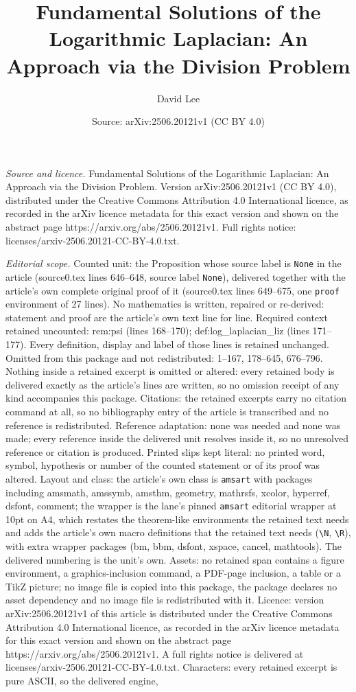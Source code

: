 \documentclass[10pt,a4paper]{amsart}
\title[Fundamental Solutions of the Logarithmic Laplacian: An Appro]{Fundamental Solutions of the Logarithmic Laplacian: An Approach via the Division Problem}
\author{David Lee}
\date{Source: arXiv:2506.20121v1 (CC BY 4.0)}
\begin{document}
\maketitle

\noindent\emph{Source and licence.} Fundamental Solutions of the Logarithmic Laplacian: An Approach via the Division Problem. Version arXiv:2506.20121v1 (CC BY 4.0), distributed under the Creative Commons Attribution 4.0 International licence, as recorded in the arXiv licence metadata for this exact version and shown on the abstract page https://arxiv.org/abs/2506.20121v1. Full rights notice: licenses/arxiv-2506.20121-CC-BY-4.0.txt.\par\smallskip

\noindent\textit{Editorial scope.} Counted unit: the Proposition whose source label is \texttt{None} in the article (source0.tex lines 646--648, source label \texttt{None}), delivered together with the article's own complete original proof of it (source0.tex lines 649--675, one \texttt{proof} environment of 27 lines). No mathematics is written, repaired or re-derived: statement and proof are the article's own text line for line. Required context retained uncounted: rem:psi (lines 168--170); def:log\_laplacian\_liz (lines 171--177). Every definition, display and label of those lines is retained unchanged. Omitted from this package and not redistributed: 1--167, 178--645, 676--796. Nothing inside a retained excerpt is omitted or altered: every retained body is delivered exactly as the article's lines are written, so no omission receipt of any kind accompanies this package. Citations: the retained excerpts carry no citation command at all, so no bibliography entry of the article is transcribed and no reference is redistributed. Reference adaptation: none was needed and none was made; every reference inside the delivered unit resolves inside it, so no unresolved reference or citation is produced. Printed slips kept literal: no printed word, symbol, hypothesis or number of the counted statement or of its proof was altered. Layout and class: the article's own class is \texttt{amsart} with packages including amsmath, amssymb, amsthm, geometry, mathrsfs, xcolor, hyperref, dsfont, comment; the wrapper is the lane's pinned \texttt{amsart} editorial wrapper at 10pt on A4, which restates the theorem-like environments the retained text needs and adds the article's own macro definitions that the retained text needs (\texttt{\textbackslash N}, \texttt{\textbackslash R}), with extra wrapper packages (bm, bbm, dsfont, xspace, cancel, mathtools). The delivered numbering is the unit's own. Assets: no retained span contains a figure environment, a graphics-inclusion command, a PDF-page inclusion, a table or a TikZ picture; no image file is copied into this package, the package declares no asset dependency and no image file is redistributed with it. Licence: version arXiv:2506.20121v1 of this article is distributed under the Creative Commons Attribution 4.0 International licence, as recorded in the arXiv licence metadata for this exact version and shown on the abstract page https://arxiv.org/abs/2506.20121v1. A full rights notice is delivered at licenses/arxiv-2506.20121-CC-BY-4.0.txt. Characters: every retained excerpt is pure ASCII, so the delivered engine, 
\end{document}
